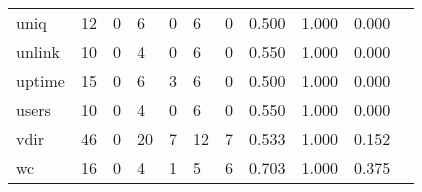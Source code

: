 \begin{longtable}{lp{1.20cm}p{1.20cm}p{1.20cm}p{1.20cm}p{1.20cm}p{1.20cm}p{1.20cm}p{1.20cm}p{1.20cm}p{1.20cm}}
uniq      &                                    12 &                                                  0 &                                                  6 &                                                  0 &                                                  6 &                                                  0 &                                         0.500 &                                              1.000 &                                              0.000 \\
unlink    &                                    10 &                                                  0 &                                                  4 &                                                  0 &                                                  6 &                                                  0 &                                         0.550 &                                              1.000 &                                              0.000 \\
uptime    &                                    15 &                                                  0 &                                                  6 &                                                  3 &                                                  6 &                                                  0 &                                         0.500 &                                              1.000 &                                              0.000 \\
users     &                                    10 &                                                  0 &                                                  4 &                                                  0 &                                                  6 &                                                  0 &                                         0.550 &                                              1.000 &                                              0.000 \\
vdir      &                                    46 &                                                  0 &                                                 20 &                                                  7 &                                                 12 &                                                  7 &                                         0.533 &                                              1.000 &                                              0.152 \\
wc        &                                    16 &                                                  0 &                                                  4 &                                                  1 &                                                  5 &                                                  6 &                                         0.703 &                                              1.000 &                                              0.375 \\

\end{longtable}
